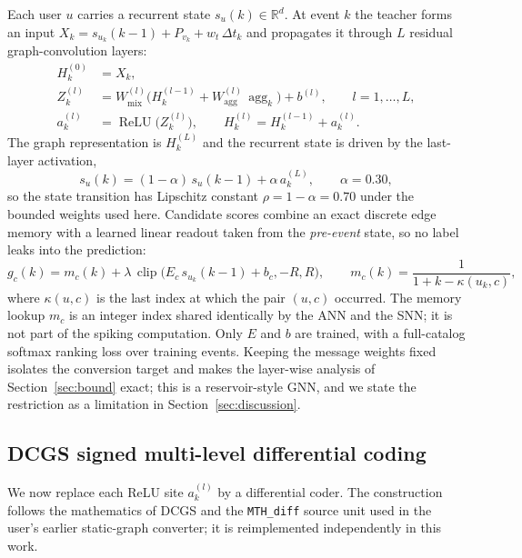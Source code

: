 \documentclass[preprint,12pt]{elsarticle}
\begin{document}
Each user $u$ carries a recurrent state $s_u(k)\in\mathbb R^{d}$. At event $k$ the teacher forms an input $X_k=s_{u_k}(k-1)+P_{v_k}+w_t\,\Delta t_k$ and propagates it through $L$ residual graph-convolution layers:
\begin{align}
H^{(0)}_k &= X_k,\\
Z^{(l)}_k &= W^{(l)}_{\mathrm{mix}}\Big(H^{(l-1)}_k+W^{(l)}_{\mathrm{agg}}\,\operatorname{agg}_k\Big)+b^{(l)},
\qquad l=1,\ldots,L,\\
a^{(l)}_k &= \operatorname{ReLU}\big(Z^{(l)}_k\big),\qquad
H^{(l)}_k = H^{(l-1)}_k + a^{(l)}_k .
\label{eq:gnn}
\end{align}
The graph representation is $H^{(L)}_k$ and the recurrent state is driven by the last-layer activation,
\begin{equation}
s_u(k)=(1-\alpha)\,s_u(k-1)+\alpha\,a^{(L)}_k,\qquad \alpha=0.30,
\label{eq:state}
\end{equation}
so the state transition has Lipschitz constant $\rho=1-\alpha=0.70$ under the bounded weights used here. Candidate scores combine an exact discrete edge memory with a learned linear readout taken from the \emph{pre-event} state, so no label leaks into the prediction:
\begin{equation}
g_c(k)=m_c(k)+\lambda\,\operatorname{clip}\big(E_c\,s_{u_k}(k-1)+b_c,-R,R\big),
\qquad m_c(k)=\frac{1}{1+k-\kappa(u_k,c)},
\label{eq:readout}
\end{equation}
where $\kappa(u,c)$ is the last index at which the pair $(u,c)$ occurred. The memory lookup $m_c$ is an integer index shared identically by the ANN and the SNN; it is not part of the spiking computation. Only $E$ and $b$ are trained, with a full-catalog softmax ranking loss over training events. Keeping the message weights fixed isolates the conversion target and makes the layer-wise analysis of Section~\ref{sec:bound} exact; this is a reservoir-style GNN, and we state the restriction as a limitation in Section~\ref{sec:discussion}.

\subsection{DCGS signed multi-level differential coding}
\label{sec:dcgs}

We now replace each ReLU site $a^{(l)}_k$ by a differential coder. The construction follows the mathematics of DCGS \cite{huang2025dcgs} and the \texttt{MTH\_diff} source unit used in the user's earlier static-graph converter; it is reimplemented independently in this work.
\end{document}

